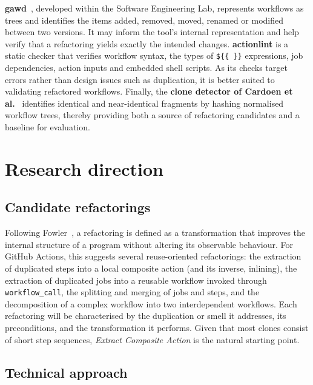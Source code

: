 \documentclass[a4paper,11pt,notitlepage]{report}
\begin{document}
\textbf{gawd}~\cite{RostamiMazrae2024}, developed within the Software Engineering Lab,
represents workflows as trees and identifies the items added, removed, moved, renamed or
modified between two versions. It may inform the tool's internal representation and help
verify that a refactoring yields exactly the intended changes.
\textbf{actionlint} is a static checker that verifies workflow syntax, the types of
\texttt{\$\{\{~\}\}} expressions, job dependencies, action inputs and embedded shell
scripts. As its checks target errors rather than design issues such as duplication, it is
better suited to validating refactored workflows.
Finally, the \textbf{clone detector of Cardoen et al.}~\cite{Cardoen2026} identifies
identical and near-identical fragments by hashing normalised workflow trees, thereby
providing both a source of refactoring candidates and a baseline for evaluation.

\chapter{Research direction} \label{ch_direction}

\section{Candidate refactorings} \label{sec_candidates}

Following Fowler~\cite{Fowler2018}, a refactoring is defined as a transformation that
improves the internal structure of a program without altering its observable behaviour.
For GitHub Actions, this suggests several reuse-oriented refactorings: the extraction of
duplicated steps into a local composite action (and its inverse, inlining), the extraction
of duplicated jobs into a reusable workflow invoked through \texttt{workflow\_call}, the
splitting and merging of jobs and steps, and the decomposition of a complex workflow into
two interdependent workflows. Each refactoring will be characterised by the duplication or
smell it addresses, its preconditions, and the transformation it performs. Given that most
clones consist of short step sequences, \emph{Extract Composite Action} is the natural
starting point.

\section{Technical approach} \label{sec_approach}
\end{document}
